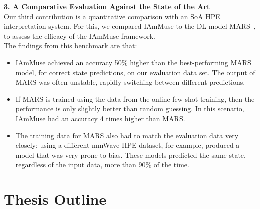\noindent \textbf{3. A Comparative Evaluation Against the State of the Art}\\
Our third contribution is a quantitative comparison with an SoA HPE interpretation system.
For this, we compared IAmMuse to the DL model MARS~\cite{an2021mars}, to assess the efficacy of the IAmMuse framework.\\
The findings from this benchmark are that:
\begin{itemize}
    \item 
        IAmMuse achieved an accuracy 50\% higher than the best-performing MARS model, for correct state predictions, on our evaluation data set.
        The output of MARS was often unstable, rapidly switching between different predictions.
    \item 
        If MARS is trained using the data from the online few-shot training, then the performance is only slightly better than random guessing.
        In this scenario, IAmMuse had an accuracy 4 times higher than MARS.
    \item 
        The training data for MARS also had to match the evaluation data very closely; using a different mmWave HPE dataset, for example, produced a model that was very prone to bias.
        These models predicted the same state, regardless of the input data, more than 90\% of the time.
\end{itemize}


\section*{Thesis Outline}

